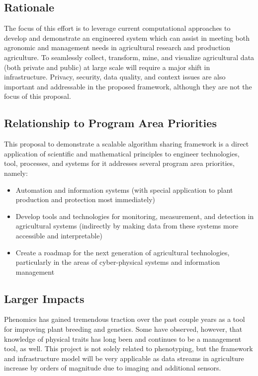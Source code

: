 \documentclass[11pt]{article}
\begin{document}
\subsection{Rationale}

The focus of this effort is to leverage current computational approaches to develop and demonstrate an 
engineered system which can assist in meeting both agronomic and management needs in agricultural 
research and production agriculture.  To seamlessly collect, transform, mine, and visualize agricultural data 
(both private and public) at large scale will require a major shift in infrastructure. Privacy, security, data quality, 
and context issues are also important and addressable in the proposed framework, although they are 
not the focus of this proposal.

\subsection{Relationship to Program Area Priorities}

This proposal to demonstrate a scalable algorithm sharing framework is a direct application of scientific 
and mathematical principles to engineer technologies, tool, processes, and systems for it addresses several 
program area priorities, namely:

\begin{itemize}
\item Automation and information systems (with special application to plant production and protection most immediately)
\item Develop tools and technologies for monitoring, measurement, and detection in agricultural systems 
	(indirectly by making data from these systems more accessible and interpretable)
\item Create a roadmap for the next generation of agricultural technologies, particularly in the areas of 
	cyber-physical systems and information management
\end{itemize}

\subsection{Larger Impacts}

Phenomics has gained tremendous traction over the past couple years as a tool for improving plant 
breeding and genetics. Some have observed, however, that knowledge of physical traits has long been 
and continues to be a management tool, as well.  This project is not solely related to phenotyping, but the 
framework and infrastructure model will be very applicable as data streams in agriculture increase by 
orders of magnitude due to imaging and additional sensors.
\end{document}
